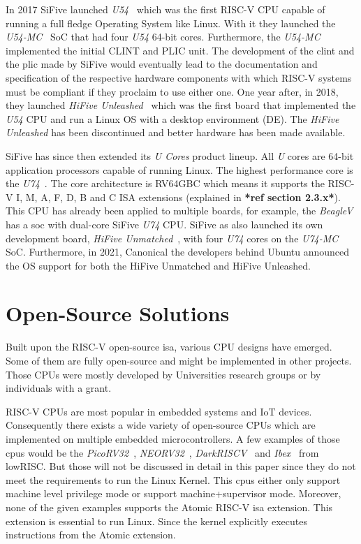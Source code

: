 In 2017 SiFive launched \textit{U54}~\cite{u54} which was the first RISC-V CPU capable of running a full fledge Operating System like Linux. With it they launched the \textit{U54-MC}~\cite{u54-mc} SoC that had four \textit{U54} 64-bit cores. Furthermore, the \textit{U54-MC} implemented the initial CLINT and PLIC unit. The development of the \acrshort{clint} and the \acrshort{plic} made by SiFive would eventually lead to the documentation and specification of the respective hardware components with which RISC-V systems must be compliant if they proclaim to use either one. One year after, in 2018, they launched \textit{HiFive Unleashed}~\cite{hifive_unleashed} which was the first board that implemented the \textit{U54} CPU and run a Linux OS with a desktop environment (DE). The \textit{HiFive Unleashed} has been discontinued and better hardware has been made available.

SiFive has since then extended its \textit{U Cores} product lineup. All \textit{U} cores are 64-bit application processors capable of running Linux. The highest performance core is the \textit{U74}~\cite{u74}. The core architecture is RV64GBC which means it supports the RISC-V I, M, A, F, D, B and C ISA extensions (explained in \textbf{*ref section 2.3.x*}). This CPU has already been applied to multiple boards, for example, the \textit{BeagleV} has a \acrshort{soc} with dual-core SiFive \textit{U74} CPU. SiFive as also launched its own development board, \textit{HiFive Unmatched}~\cite{hifive_unmatched}, with four \textit{U74} cores on the \textit{U74-MC}~\cite{u74-mc} SoC. Furthermore, in 2021, Canonical the developers behind Ubuntu announced the OS support for both the HiFive Unmatched and HiFive Unleashed.

\section{Open-Source Solutions}
\label{section:open_source_solutions}
Built upon the RISC-V open-source \acrlong{isa}, various CPU designs have emerged. Some of them are fully open-source and might be implemented in other projects. Those CPUs were mostly developed by Universities research groups or by individuals with a grant.

RISC-V CPUs are most popular in embedded systems and IoT devices. Consequently there exists a wide variety of open-source CPUs which are implemented on multiple embedded microcontrollers. A few examples of those \acrshort{cpu}s would be the \textit{PicoRV32}~\cite{picorv32}, \textit{NEORV32}~\cite{neorv32}, \textit{DarkRISCV}~\cite{darkriscv} and \textit{Ibex}~\cite{ibex} from lowRISC. But those will not be discussed in detail in this paper since they do not meet the requirements to run the Linux Kernel. This \acrshort{cpu}s either only support \acrfull{machine} level privilege mode or support \acrfull{machine}+\acrfull{supervisor} mode. Moreover, none of the given examples supports the Atomic RISC-V \acrshort{isa} extension. This extension is essential to run Linux. Since the kernel explicitly executes instructions from the Atomic extension.

